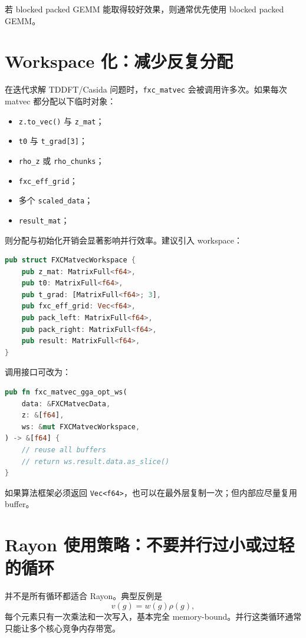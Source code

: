 \documentclass[11pt,a4paper]{ctexart}
\begin{document}
若 blocked packed GEMM 能取得较好效果，则通常优先使用 blocked packed GEMM。

\section{Workspace 化：减少反复分配}

在迭代求解 TDDFT/Casida 问题时，\texttt{fxc\_matvec} 会被调用许多次。如果每次 matvec 都分配以下临时对象：

\begin{itemize}[leftmargin=2em]
  \item \texttt{z.to\_vec()} 与 \texttt{z\_mat}；
  \item \texttt{t0} 与 \texttt{t\_grad[3]}；
  \item \texttt{rho\_z} 或 \texttt{rho\_chunks}；
  \item \texttt{fxc\_eff\_grid}；
  \item 多个 \texttt{scaled\_data}；
  \item \texttt{result\_mat}；
\end{itemize}

则分配与初始化开销会显著影响并行效率。建议引入 workspace：

\begin{lstlisting}[language=Rust,style=code]
pub struct FXCMatvecWorkspace {
    pub z_mat: MatrixFull<f64>,
    pub t0: MatrixFull<f64>,
    pub t_grad: [MatrixFull<f64>; 3],
    pub fxc_eff_grid: Vec<f64>,
    pub pack_left: MatrixFull<f64>,
    pub pack_right: MatrixFull<f64>,
    pub result: MatrixFull<f64>,
}
\end{lstlisting}

调用接口可改为：

\begin{lstlisting}[language=Rust,style=code]
pub fn fxc_matvec_gga_opt_ws(
    data: &FXCMatvecData,
    z: &[f64],
    ws: &mut FXCMatvecWorkspace,
) -> &[f64] {
    // reuse all buffers
    // return ws.result.data.as_slice()
}
\end{lstlisting}

如果算法框架必须返回 \texttt{Vec<f64>}，也可以在最外层复制一次；但内部应尽量复用 buffer。

\section{Rayon 使用策略：不要并行过小或过轻的循环}

并不是所有循环都适合 Rayon。典型反例是
\begin{equation}
  v(g)=w(g)\rho(g),
\end{equation}
每个元素只有一次乘法和一次写入，基本完全 memory-bound。并行这类循环通常只能让多个核心竞争内存带宽。
\end{document}
